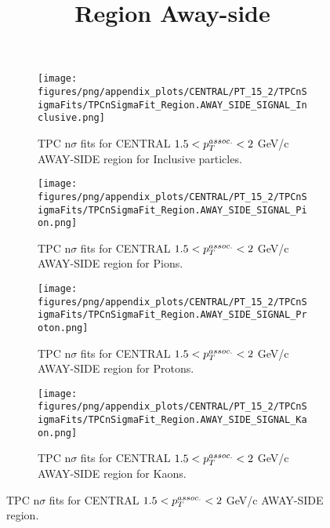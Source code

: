             \begin{figure}[H]
                \title{Region Away-side}
                \begin{subfigure}[b]{0.5\textwidth}
                    \centering
                    \texttt{[image: figures/png/appendix\_plots/CENTRAL/PT\_15\_2/TPCnSigmaFits/TPCnSigmaFit\_Region.AWAY\_SIDE\_SIGNAL\_Inclusive.png]}
                    \caption{TPC n$\sigma$ fits for CENTRAL $1.5 < \pTassoc < 2$ GeV/c AWAY-SIDE region for Inclusive particles.}
                    \label{fig:appendix_CENTRAL_$1.5 < \pTassoc < 2$ GeV/c_AWAY_SIDE_SIGNAL_Inclusive}
                \end{subfigure}
                \begin{subfigure}[b]{0.5\textwidth}
                    \centering
                    \texttt{[image: figures/png/appendix\_plots/CENTRAL/PT\_15\_2/TPCnSigmaFits/TPCnSigmaFit\_Region.AWAY\_SIDE\_SIGNAL\_Pion.png]}
                    \caption{TPC n$\sigma$ fits for CENTRAL $1.5 < \pTassoc < 2$ GeV/c AWAY-SIDE region for Pions.}
                    \label{fig:appendix_CENTRAL_$1.5 < \pTassoc < 2$ GeV/c_AWAY_SIDE_SIGNAL_Pion}
                \end{subfigure}
                \begin{subfigure}[b]{0.5\textwidth}
                    \centering
                    \texttt{[image: figures/png/appendix\_plots/CENTRAL/PT\_15\_2/TPCnSigmaFits/TPCnSigmaFit\_Region.AWAY\_SIDE\_SIGNAL\_Proton.png]}
                    \caption{TPC n$\sigma$ fits for CENTRAL $1.5 < \pTassoc < 2$ GeV/c AWAY-SIDE region for Protons.}
                    \label{fig:appendix_CENTRAL_$1.5 < \pTassoc < 2$ GeV/c_AWAY_SIDE_SIGNAL_Proton}
                \end{subfigure}
                \begin{subfigure}[b]{0.5\textwidth}
                    \centering
                    \texttt{[image: figures/png/appendix\_plots/CENTRAL/PT\_15\_2/TPCnSigmaFits/TPCnSigmaFit\_Region.AWAY\_SIDE\_SIGNAL\_Kaon.png]}
                    \caption{TPC n$\sigma$ fits for CENTRAL $1.5 < \pTassoc < 2$ GeV/c AWAY-SIDE region for Kaons.}
                    \label{fig:appendix_CENTRAL_$1.5 < \pTassoc < 2$ GeV/c_AWAY_SIDE_SIGNAL_Kaon}
                \end{subfigure}
                \caption{TPC n$\sigma$ fits for CENTRAL $1.5 < \pTassoc < 2$ GeV/c AWAY-SIDE region.}
                \label{fig:appendix_CENTRAL_$1.5 < \pTassoc < 2$ GeV/c_AWAY_SIDE_SIGNAL}
            \end{figure}
